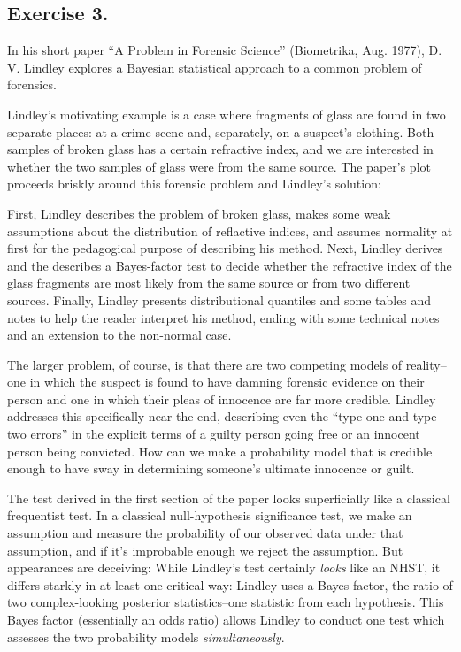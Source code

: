 \documentclass{article}
\begin{document}
 

\subsection{Exercise 3.}

In his short paper ``A Problem in Forensic Science'' (Biometrika, Aug. 1977), D. V. Lindley explores
a Bayesian statistical approach to a common problem of forensics.

Lindley's motivating example is a case where fragments of glass are found in two separate places:
at a crime scene and, separately, on a suspect's clothing. Both samples of broken glass has a certain refractive
index, and we are interested in whether the two samples of glass were from the same source.
The paper's plot proceeds briskly around this forensic problem and Lindley's solution:

First, Lindley describes the problem of broken glass, 
makes some weak assumptions about the distribution of reflactive indices, and assumes normality at first 
for the pedagogical purpose of describing his method.
Next, Lindley derives and the describes a Bayes-factor test to decide
whether the refractive index of the glass fragments are most likely
from the same source or from two different sources. Finally, Lindley 
presents distributional quantiles and some tables and notes
to help the reader interpret his method, ending with some technical notes and an extension 
to the non-normal case.

The larger problem, of course, is that there are two competing models of reality--one in which the suspect is found to have 
damning forensic evidence on their person and one in which their pleas of innocence are far more credible.
Lindley addresses this specifically near the end, describing even the ``type-one and type-two errors'' in the explicit 
terms of a guilty person going free or an innocent person being convicted. How can we make a probability model
that is credible enough to have sway in determining someone's ultimate innocence or guilt.

The test derived in the first section of the paper looks superficially like a classical frequentist test.
In a classical null-hypothesis significance test, we make an assumption and measure the probability of
our observed data under that assumption, and if it's improbable enough we reject the assumption. 
But appearances are deceiving: While Lindley's test certainly \textit{looks} like an NHST, 
it differs starkly in at least one critical way: Lindley uses a Bayes factor,
the ratio of two complex-looking posterior statistics--one statistic from each hypothesis.
This Bayes factor (essentially an odds ratio) allows Lindley to conduct one test which 
assesses the two probability models \textit{simultaneously}. 
\end{document}
